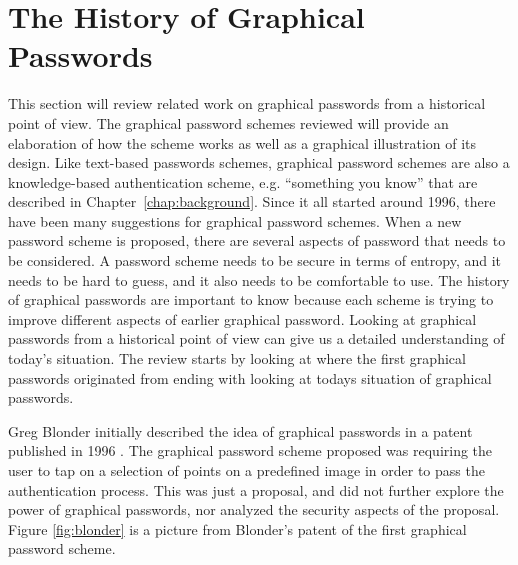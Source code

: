 \section{The History of Graphical Passwords} \label{sec:historygraphicalpasswords}
	 
  This section will review related work on graphical passwords from a historical point of view. The graphical password schemes reviewed will provide an elaboration of how the scheme works as well as a graphical illustration of its design. Like text-based passwords schemes, graphical password schemes are also a knowledge-based authentication scheme, e.g. ``something you know'' that are described in Chapter~\ref{chap:background}. Since it all started around 1996, there have been many suggestions for graphical password schemes. When a new password scheme is proposed, there are several aspects of password that needs to be considered. A password scheme needs to be secure in terms of entropy, and it needs to be hard to guess, and it also needs to be comfortable to use. The history of graphical passwords are important to know because each scheme is trying to improve different aspects of earlier graphical password. Looking at graphical passwords from a historical point of view can give us a detailed understanding of today's situation. The review starts by looking at where the first graphical passwords originated from ending with looking at todays situation of graphical passwords.

  Greg Blonder initially described the idea of graphical passwords in a patent published in 1996 \cite{Blonder}. The graphical password scheme proposed was requiring the user to tap on a selection of points on a predefined image in order to pass the authentication process. This was just a proposal, and did not further explore the power of graphical passwords, nor analyzed the security aspects of the proposal. Figure \ref{fig:blonder} is a picture from Blonder's patent of the first graphical password scheme.

